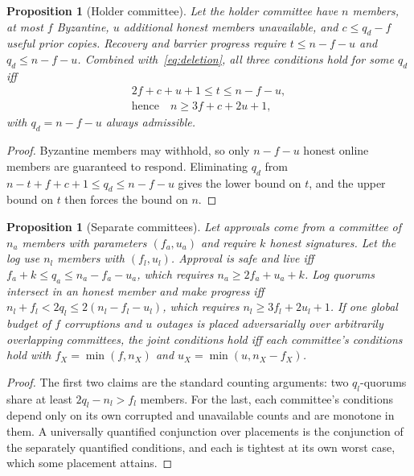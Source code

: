 \documentclass[pdflatex,sn-mathphys-num,twocolumn]{sn-jnl}
\theoremstyle{plain}
\newtheorem{proposition}[theorem]{Proposition}
\theoremstyle{definition}
\begin{document}
\begin{proposition}[Holder committee]\label{prop:holders}
Let the holder committee have $n$ members, at most $f$ Byzantine, $u$ additional honest members unavailable, and $c\le q_d-f$ useful prior copies. Recovery and barrier progress require $t\le n-f-u$ and $q_d\le n-f-u$. Combined with~\eqref{eq:deletion}, all three conditions hold for some $q_d$ iff
\begin{equation}\label{eq:feasible}
\begin{gathered}
 2f+c+u+1\le t\le n-f-u,\\
 \text{hence}\quad n\ge3f+c+2u+1,
\end{gathered}
\end{equation}
with $q_d=n-f-u$ always admissible.
\end{proposition}
\begin{proof}
Byzantine members may withhold, so only $n-f-u$ honest online members are guaranteed to respond. Eliminating $q_d$ from $n-t+f+c+1\le q_d\le n-f-u$ gives the lower bound on $t$, and the upper bound on $t$ then forces the bound on $n$.
\end{proof}

\begin{proposition}[Separate committees]\label{prop:committees}
Let approvals come from a committee of $n_a$ members with parameters $(f_a,u_a)$ and require $k$ honest signatures. Let the log use $n_l$ members with $(f_l,u_l)$. Approval is safe and live iff $f_a+k\le q_a\le n_a-f_a-u_a$, which requires $n_a\ge2f_a+u_a+k$. Log quorums intersect in an honest member and make progress iff $n_l+f_l<2q_l\le2(n_l-f_l-u_l)$, which requires $n_l\ge3f_l+2u_l+1$. If one global budget of $f$ corruptions and $u$ outages is placed adversarially over arbitrarily overlapping committees, the joint conditions hold iff each committee's conditions hold with $f_X=\min(f,n_X)$ and $u_X=\min(u,n_X-f_X)$.
\end{proposition}
\begin{proof}
The first two claims are the standard counting arguments: two $q_l$-quorums share at least $2q_l-n_l>f_l$ members. For the last, each committee's conditions depend only on its own corrupted and unavailable counts and are monotone in them. A universally quantified conjunction over placements is the conjunction of the separately quantified conditions, and each is tightest at its own worst case, which some placement attains.
\end{proof}
\end{document}
